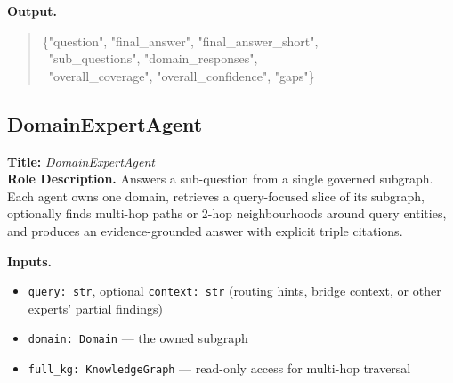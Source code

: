 \documentclass{article}
\begin{document}
\begin{agentbox}
\textbf{Output.}
\begin{quote}\footnotesize\ttfamily
\{"question", "final\_answer", "final\_answer\_short",\\
\ "sub\_questions", "domain\_responses",\\
\ "overall\_coverage", "overall\_confidence", "gaps"\}
\end{quote}
\end{agentbox}

\newpage
\subsection{DomainExpertAgent}
\label{app:qa_domain_expert}

\begin{agentbox}
\textbf{Title:} \textit{DomainExpertAgent}\\
\textbf{Role Description.} Answers a sub-question from a single
governed subgraph. Each agent owns one domain, retrieves a
query-focused slice of its subgraph, optionally finds multi-hop paths
or 2-hop neighbourhoods around query entities, and produces an
evidence-grounded answer with explicit triple citations.

\textbf{Inputs.}
\begin{itemize}[leftmargin=*,nosep]
\item \texttt{query: str}, optional \texttt{context: str} (routing hints, bridge context, or other experts' partial findings)
\item \texttt{domain: Domain} --- the owned subgraph
\item \texttt{full\_kg: KnowledgeGraph} --- read-only access for multi-hop traversal
\end{itemize}


\end{agentbox}
\end{document}
